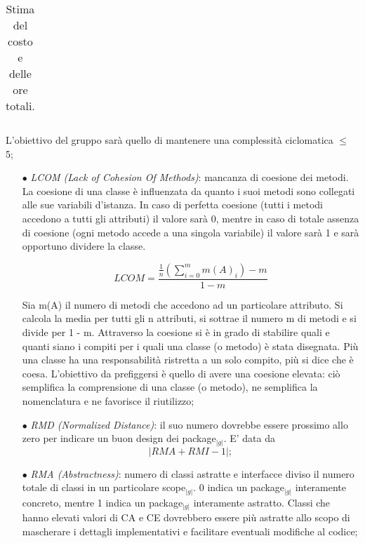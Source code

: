 {\begin{itemize}
\begin{table}[h!]
\begin{center}
\begin{tabular}{l l c}
				      \bottomrule
			      \end{tabular}
		      \end{center}	
		      \caption{Stima del costo e delle ore totali.}
	      \end{table}
	      L’obiettivo del gruppo sarà quello di mantenere una complessità ciclomatica $\leqslant$ 5;
	      \begin{itemize}
		      \item[$\bullet$] \textit{LCOM (Lack of Cohesion Of Methods)}: mancanza di coesione dei metodi. La coesione di una classe è influenzata da quanto i suoi metodi sono collegati alle 
				sue variabili d’istanza. In caso di perfetta coesione (tutti i metodi accedono a tutti gli attributi) il valore sarà 0, mentre in caso di totale assenza di 
				coesione (ogni metodo accede a una singola variabile) il valore sarà 1 e sarà opportuno dividere la classe.
	      
				\begin{equation}
				LCOM=\frac{ \frac{1}{n}(\sum_{i=0}^m m(A)_i)- m}{1-m}
				\end{equation}

				Sia m(A) il numero di metodi che accedono ad un particolare attributo. Si calcola la media per tutti gli n attributi, si sottrae il numero m di metodi e si 
				divide per 1 - m. Attraverso la coesione si è in grado di stabilire quali e quanti siano i compiti per i quali una classe (o metodo) è stata disegnata. Più una 
				classe ha una responsabilità ristretta a un solo compito, più si dice che è coesa. L’obiettivo da prefiggersi è quello di avere una coesione elevata: ciò 
				semplifica la comprensione di una classe (o metodo), ne semplifica la nomenclatura e ne favorisce il riutilizzo;

	      
	      
		      \item[$\bullet$] \textit{RMD (Normalized Distance)}: il suo numero dovrebbe essere prossimo allo zero per indicare un buon design dei package$_{|g|}$. E’ data da
			    \begin{equation}
				|RMA + RMI - 1|;
			    \end{equation}
       
		      \item[$\bullet$] \textit{RMA (Abstractness)}: numero di classi astratte e interfacce diviso il numero totale di classi in un particolare scope$_{|g|}$. 0 indica un package$_{|g|}$ 
			    interamente concreto, mentre 1 indica un package$_{|g|}$ interamente astratto. Classi che hanno elevati valori di CA e CE dovrebbero essere più astratte allo scopo 
			    di mascherare i dettagli implementativi e facilitare eventuali modifiche al codice;


\end{itemize}
\end{itemize}}
